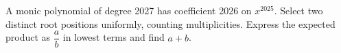 A monic polynomial of degree 2027 has coefficient 2026 on $x^{2025}$. Select two distinct root positions uniformly, counting multiplicities. Express the expected product as $\dfrac{a}{b}$ in lowest terms and find $a+b$.
